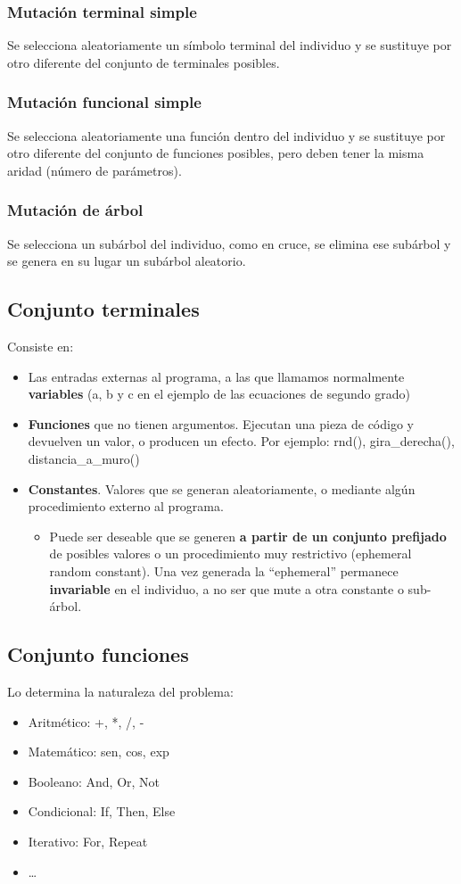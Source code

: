 \documentclass[12pt, twoside, openright]{report} %
\begin{document}
\subsubsection{Mutación terminal simple}
Se selecciona aleatoriamente un símbolo terminal del individuo y se  sustituye por otro diferente del conjunto de terminales posibles.

\subsubsection{Mutación funcional simple}
Se selecciona aleatoriamente una función dentro del individuo y se sustituye por otro diferente del conjunto de funciones posibles, pero deben tener la misma aridad (número de parámetros).

\subsubsection{Mutación de árbol}
Se selecciona un subárbol del individuo, como en cruce, se elimina ese subárbol y se genera en su lugar un subárbol aleatorio.

\subsection{Conjunto terminales}
Consiste en:
\begin{itemize}
	\item Las entradas externas al programa, a las que llamamos normalmente \textbf{variables} (a, b y c en el ejemplo de las ecuaciones de segundo grado)
	\item \textbf{Funciones} que no tienen argumentos. Ejecutan una pieza de código y devuelven un valor, o producen un efecto. Por ejemplo: rnd(), gira\_derecha(), distancia\_a\_muro() 
	\item \textbf{Constantes}. Valores que se generan aleatoriamente, o mediante algún procedimiento externo al programa.
	\begin{itemize}
		\item Puede ser deseable que se generen \textbf{a partir de un conjunto prefijado} de posibles valores o un procedimiento muy restrictivo (ephemeral random constant).
		Una vez generada la “ephemeral” permanece \textbf{invariable} en el individuo, a no ser que mute a otra constante o sub-árbol.
	\end{itemize}	
\end{itemize}

\subsection{Conjunto funciones}
Lo determina la naturaleza del problema:
\begin{itemize}
	\item Aritmético: +, *, /, -
	\item Matemático: sen, cos, exp
	\item Booleano: And, Or, Not
	\item Condicional: If, Then, Else
	\item Iterativo: For, Repeat
	\item …
\end{itemize}
\end{document}
